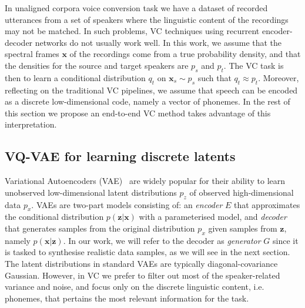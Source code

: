\documentclass{article}
\begin{document}
In unaligned corpora voice conversion task we have a dataset of recorded utterances from a set of speakers where the linguistic content of the recordings may not be matched.
In such problems, VC techniques using recurrent encoder-decoder networks do not usually work well.
In this work, we assume that the spectral frames $\mathbf{x}$ of the recordings come from a true probability density, and that the densities for the source and target speakers are $p_s$ and $p_t$. The VC task is then to learn a conditional distribution $q_t$ on $\mathbf{x}_s \sim p_s$ such that $q_t \approx p_t$.
Moreover, reflecting on the traditional VC pipelines, we assume that speech can be encoded as a discrete low-dimensional code, namely a vector of phonemes. In the rest of this section we propose an end-to-end VC method takes advantage of this interpretation.

\subsection{VQ-VAE for learning discrete latents}
Variational Autoencoders (VAE)~\cite{Kingma2013} are widely popular for their ability to learn unobserved low-dimensional latent distributions $p_z$ of observed high-dimensional data $p_x$. VAEs are two-part models consisting of: an \textit{encoder} $E$  that approximates the conditional distribution $p(\mathbf{z}|\mathbf{x})$ with a parameterised model, and \textit{decoder} that generates samples from the original distribution $p_x$ given samples from $\mathbf{z}$, namely $p(\mathbf{x}|\mathbf{z})$.
In our work, we will refer to the decoder as \textit{generator} $G$ since it is tasked to synthesise realistic data samples, as we will see in the next section.
The latent distributions in standard VAEs are typically diagonal-covariance Gaussian. 
However, in VC we prefer to filter out most of the speaker-related variance and noise, and focus only on the discrete linguistic content, i.e. phonemes, that pertains the most relevant information for the task. 
\end{document}
